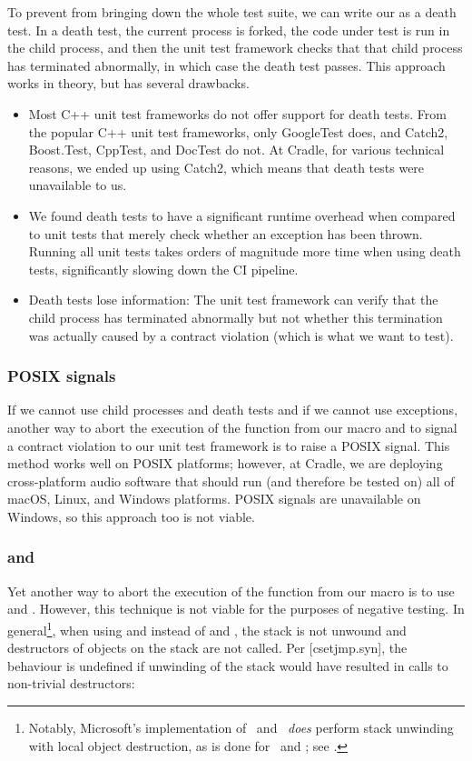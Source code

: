 To prevent  from bringing down the whole test suite, we can write our  as a death test. In a death test, the current process is forked, the code under test is run in the child process, and then the unit test framework checks that that child process has terminated abnormally, in which case the death test passes. This approach works in theory, but has several drawbacks.
\begin{itemize}
\item Most C++ unit test frameworks do not offer support for death tests. From the popular C++ unit test frameworks, only GoogleTest does, and Catch2, Boost.Test, CppTest, and DocTest do not. At Cradle, for various technical reasons, we ended up using Catch2, which means that death tests were unavailable to us.
\item We found death tests to have a significant runtime overhead when compared to unit tests that merely check whether an exception has been thrown. Running all unit tests takes orders of magnitude more time when using death tests, significantly slowing down the CI pipeline.
\item Death tests lose information: The unit test framework can verify that the child process has terminated abnormally but not whether this termination was actually caused by a contract violation (which is what we want to test).
\end{itemize}

\subsubsection{POSIX signals}

If we cannot use child processes and death tests and if we cannot use exceptions, another way to abort the execution of the function from our  macro and to signal a contract violation to our unit test framework is to raise a POSIX signal. This method works well on POSIX platforms; however, at Cradle, we are deploying cross-platform audio software that should run (and therefore be tested on) all of macOS, Linux, and Windows platforms. POSIX signals are unavailable on Windows, so this approach too is not viable.

\subsubsection{ and }

Yet another way to abort the execution of the function from our  macro is to use  and . However, this technique is not viable for the purposes of negative testing. In general\footnote{Notably, Microsoft's implementation of   and  \emph{does} perform stack unwinding with local object destruction, as is done for  and ; see \cite{MSVCDocLongjmp}.}, when using  and  instead of  and , the stack is not unwound and destructors of objects on the stack are not called. Per [csetjmp.syn], the behaviour is undefined if unwinding of the stack would have resulted in calls to non-trivial destructors:

